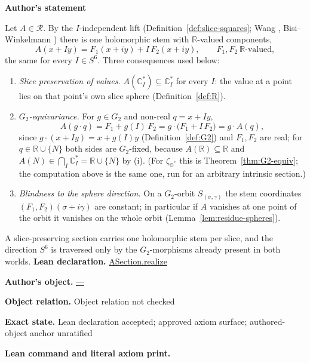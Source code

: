\documentclass[11pt]{article}
\newcommand{\OO}{\mathbb{O}}
\newcommand{\CC}{\mathbb{C}}
\newcommand{\RR}{\mathbb{R}}
\newcommand{\Ostar}{\OO^{*}}
\newcommand{\zetaO}{\zeta_{\Ostar}}
\providecommand{\Gtwo}{G_2}
\theoremstyle{plain}
\theoremstyle{definition}
\theoremstyle{remark}
\begin{document}
\begin{tcolorbox}[provenancecard,title={38. Definition - The section's slice data and equivariance},title after break={38. Definition - The section's slice data and equivariance (continued)}]
\textbf{Author's statement}\par
Let $A\in\mathcal R$. By the $I$-independent lift (Definition~\ref{def:slice-squares}; Wang
\cite[Rem.~2.11]{Wang}, Bisi--Winkelmann \cite[\S3.7]{BisiWinkelmann}) there is one holomorphic
stem with $\RR$-valued components,
\[
  A(x+Iy)=F_1(x+iy)+I\,F_2(x+iy),\qquad F_1,F_2\ \RR\text{-valued},
\]
the same for every $I\in S^6$. Three consequences used below:
\begin{enumerate}[label=\textup{(\roman*)},leftmargin=2.6em]
\item \emph{Slice preservation of values.} $A(\CC_I^{*})\subseteq\CC_I^{*}$ for every $I$: the
  value at a point lies on that point's own slice sphere (Definition~\ref{def:R}).
\item \emph{$\Gtwo$-equivariance.} For $g\in\Gtwo$ and non-real $q=x+Iy$,
  \[
    A(g\cdot q)=F_1+g(I)\,F_2=g\cdot\bigl(F_1+I\,F_2\bigr)=g\cdot A(q),
  \]
  since $g\cdot(x+Iy)=x+g(I)y$ (Definition~\ref{def:G2}) and $F_1,F_2$ are real; for
  $q\in\RR\cup\{N\}$ both sides are $\Gtwo$-fixed, because $A(\RR)\subseteq\RR$ and
  $A(N)\in\bigcap_I\CC_I^{*}=\RR\cup\{N\}$ by \textup{(i)}. (For $\zetaO$ this is
  Theorem~\ref{thm:G2-equiv}; the computation above is the same one, run for an arbitrary
  intrinsic section.)
\item \emph{Blindness to the sphere direction.} On a $\Gtwo$-orbit $S_{(\sigma,\gamma)}$ the stem
  coordinates $(F_1,F_2)(\sigma+i\gamma)$ are constant; in particular if $A$ vanishes at one
  point of the orbit it vanishes on the whole orbit (Lemma~\ref{lem:residue-spheres}).
\end{enumerate}
A slice-preserving section carries one holomorphic stem per slice, and the direction $S^6$ is
traversed only by the $\Gtwo$-morphisms already present in both worlds.
\tcblower
\textbf{Lean declaration.} \url{ASection.realize}
\par\textbf{Author's object.} \url{—}
\par\textbf{Object relation.} Object relation not checked
\par\textbf{Exact state.} Lean declaration accepted; approved axiom surface; authored-object anchor unratified
\par\smallskip\textbf{Lean command and literal axiom print.}
\begin{Verbatim}[breaklines=true,breakanywhere=true,fontsize=\small]

\end{Verbatim}
\end{tcolorbox}
\end{document}
